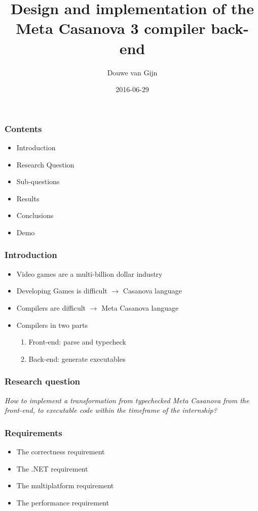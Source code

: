 \documentclass[xetex,serif,aspectratio=169]{beamer}
\title{Design and implementation of the\\Meta Casanova 3 compiler back-end}
\author{Douwe van Gijn}
\date{2016-06-29}
\begin{document}
\begin{frame}
\titlepage

\end{frame}\begin{frame}\frametitle{Contents}
\begin{itemize}
    \item Introduction
    \item Research Question
    \item Sub-questions
    \item Results
    \item Conclusions
    \item Demo
\end{itemize}

\end{frame}\begin{frame}\frametitle{Introduction}
\begin{itemize}
    \item Video games are a multi-billion dollar industry
    \item Developing Games is difficult $\longrightarrow$ Casanova language
    \item Compilers are difficult $\longrightarrow$ Meta Casanova language
    \item Compilers in two parts
    \begin{enumerate}
        \item Front-end: parse and typecheck
        \item Back-end: generate executables
    \end{enumerate}
\end{itemize}

\end{frame}\begin{frame}\frametitle{Research question}
\textit{How to implement a transformation from typechecked Meta Casanova from the front-end, to executable code within the timeframe of the internship?}

\end{frame}\begin{frame}\frametitle{Requirements}
\begin{itemize}
    \item The correctness requirement
    \item The .NET requirement
    \item The multiplatform requirement
    \item The performance requirement
\end{itemize}


\end{frame}
\end{document}
